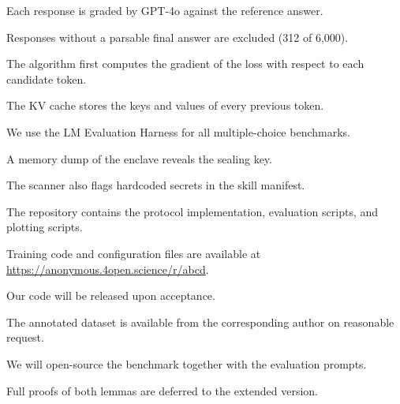 
Each response is graded by GPT-4o against the reference answer.

Responses without a parsable final answer are excluded (312 of 6,000).

The algorithm first computes the gradient of the loss with respect to each candidate token.

The KV cache stores the keys and values of every previous token.

We use the LM Evaluation Harness for all multiple-choice benchmarks.

A memory dump of the enclave reveals the sealing key.

The scanner also flags hardcoded secrets in the skill manifest.

The repository contains the protocol implementation, evaluation scripts, and plotting scripts.

Training code and configuration files are available at \url{https://anonymous.4open.science/r/abcd}.


Our code will be released upon acceptance.

The annotated dataset is available from the corresponding author on reasonable request.

We will open-source the benchmark together with the evaluation prompts.

Full proofs of both lemmas are deferred to the extended version.

